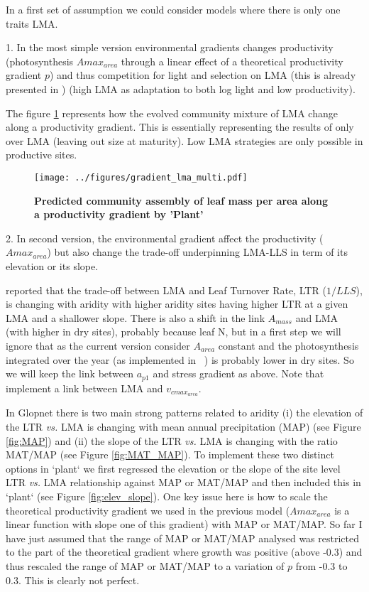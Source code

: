 \documentclass[a4paper,11pt]{article}
\begin{document}
In a first set of assumption we could consider models where there is only one traits LMA.

\clearpage

1. In the most simple version environmental gradients changes productivity (photosynthesis $A{max}_{area}$ through a linear effect of a theoretical productivity gradient $p$) and
thus competition for light and selection on LMA (this is already presented in \citet{Falster-2017}) (high LMA as adaptation to both log light and low productivity).

The figure \ref{fig:lma} represents how the evolved community mixture of LMA change along a productivity gradient. This is essentially representing the results of \citet{Falster-2017} only over LMA (leaving out size at maturity). Low LMA strategies are only possible in productive sites.

\begin{figure}[ht]
\centering
\texttt{[image: ../figures/gradient\_lma\_multi.pdf]}
\caption{\textbf{Predicted community assembly of leaf mass per area along a productivity gradient by 'Plant' \citep[see][]{Falster-2016}}
\label{fig:lma}}
\end{figure}

\clearpage

2. In second version, the environmental gradient affect the productivity ($A{max}_{area}$) but also change the trade-off underpinning LMA-LLS in term of its elevation or its slope.

\citet{Wright-2005} reported that the trade-off between LMA and Leaf Turnover Rate, LTR ($1/LLS$), is changing with aridity with higher aridity sites having higher LTR at a given LMA and a shallower slope. There is also a shift in the link $A_{mass}$ and LMA (with higher in dry sites), probably because leaf N, but in a first step we will ignore that as the current version consider $A_{area}$ constant and the photosynthesis integrated over the year (as implemented in \plant\ ) is probably lower in dry sites. So we will keep the link between $a_{p1}$ and stress gradient as above. Note that \citet{Sakschewski-2015} implement a link between LMA and $v_{cmax_{area}}$.

In Glopnet there is two main strong patterns related to aridity (i) the elevation of the LTR \textit{vs.} LMA is changing with mean annual precipitation (MAP) (see Figure \ref{fig:MAP}) and (ii) the slope of the LTR \textit{vs.} LMA is changing with the ratio MAT/MAP (see Figure \ref{fig:MAT_MAP}). To implement these two distinct options in `plant` we first regressed the elevation or the slope of the site level LTR \textit{vs.} LMA relationship against MAP or MAT/MAP and then included this in `plant` (see Figure \ref{fig:elev_slope}). One key issue here is how to scale the theoretical productivity gradient we used in the previous model ($A{max}_{area}$ is a linear function with slope one of this gradient) with MAP or MAT/MAP. So far I have just assumed that the range of MAP or MAT/MAP analysed was restricted to the part of the theoretical gradient where growth was positive (above -0.3) and thus rescaled the range of MAP or MAT/MAP to a variation of $p$ from -0.3 to 0.3. This is clearly not perfect.
\end{document}
